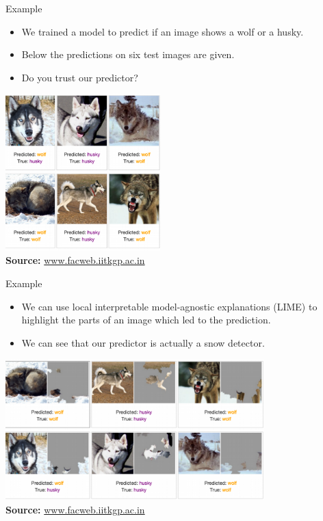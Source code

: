 \documentclass[11pt,compress,t,notes=noshow, xcolor=table]{beamer}
\begin{document}
\begin{vbframe}{Example}
	\begin{itemize}
		\item We trained a model to predict if an image shows a wolf or a husky. 
		\item Below the predictions on six test images are given. 
		\item Do you trust our predictor? 
	\end{itemize}
	\begin{center}
		\includegraphics[width=0.45\textwidth]{figure/lime-wolfhusky.png}\\
		\includegraphics[width=0.45\textwidth]{figure/lime-wolfhusky2.png}\\
		{\tiny \textbf{Source:} \href{http://www.facweb.iitkgp.ac.in/~niloy/COURSE/Spring2018/IntelligentSystem/PPT_2018/why_should_i_trust_ppt.pdf}{www.facweb.iitkgp.ac.in}}
	\end{center}
\end{vbframe}

\begin{vbframe}{Example}
	\begin{itemize}
		\item We can use local interpretable model-agnostic explanations (LIME) to highlight the parts of an image which led to the prediction.
		\item We can see that our predictor is actually a snow detector. 
	\end{itemize}
	\begin{center}
		\includegraphics[width=0.75\textwidth]{figure/lime-wolfhusky3.png}\\
		{\tiny \textbf{Source:} \href{http://www.facweb.iitkgp.ac.in/~niloy/COURSE/Spring2018/IntelligentSystem/PPT_2018/why_should_i_trust_ppt.pdf}{www.facweb.iitkgp.ac.in}}
	\end{center}
\end{vbframe}

\endlecture
\end{document}
